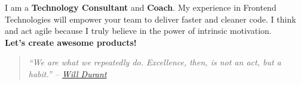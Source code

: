 \documentclass[9pt]{developercv} %
\newenvironment{itquote}
{\begin{quote}\itshape}
{\end{quote}}
\begin{document}

\begin{minipage}[t]{0.4\textwidth} %
	\vspace{-\baselineskip} %
  I am a \textbf{Technology Consultant} and \textbf{Coach}.
  My experience in Frontend Technologies will empower your team to deliver faster and cleaner code.
  I think and act agile because I truly believe in the power of intrinsic motivation.\\
  \textbf{Let's create awesome products!}
  \begin{itquote} 
    ``We are what we repeatedly do. Excellence, then, is not an act, but a habit.'' -- 
    \href{https://medium.com/the-mission/my-favourite-quote-of-all-time-is-a-misattribution-66356f22843d}{Will Durant}\\
  \end{itquote}
\end{minipage}
\hfill %
\begin{minipage}[t]{0.5\textwidth} %
	\vspace{-\baselineskip} %
	\begin{barchart}{5.5}
	\end{barchart}
  \vspace{0.4cm}
\end{minipage}


\end{document}
